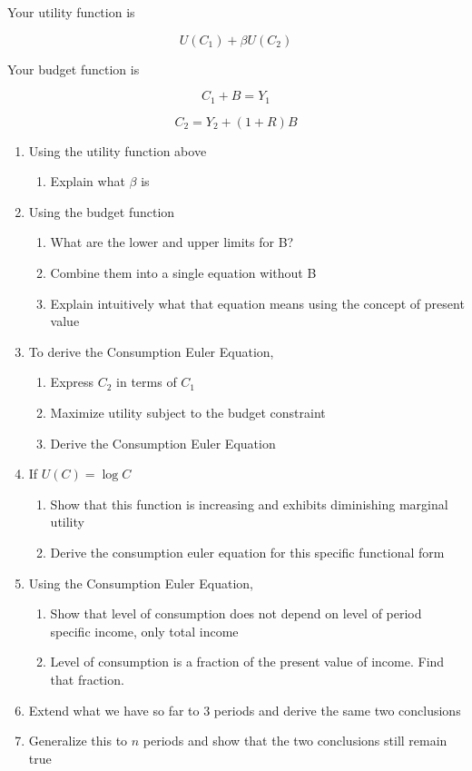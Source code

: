 \documentclass[11pt]{scrartcl}
\begin{document}
Your utility function is

\[U(C_1) + \beta U(C_2)\]

Your budget function is 

\[C_1 + B = Y_1\]

\[C_2 = Y_2 + (1+R)B\]

\begin{enumerate}
\item Using the utility function above
\begin{enumerate}
\item Explain what $\beta$ is
\end{enumerate}
\item Using the budget function
\begin{enumerate}
\item What are the lower and upper limits for B?
\item Combine them into a single equation without B
\item Explain intuitively what that equation means using the concept of present value
\end{enumerate}
\item To derive the Consumption Euler Equation,
\begin{enumerate}
\item Express $C_2$ in terms of $C_1$
\item Maximize utility subject to the budget constraint
\item Derive the Consumption Euler Equation
\end{enumerate}
\item If $U(C) = \log{C}$
\begin{enumerate}
\item Show that this function is increasing and exhibits diminishing marginal utility
\item Derive the consumption euler equation for this specific functional form
\end{enumerate}
\item Using the Consumption Euler Equation,
\begin{enumerate}
\item Show that level of consumption does not depend on level of period specific income, only total income
\item Level of consumption is a fraction of the present value of income. Find that fraction.
\end{enumerate}
\item Extend what we have so far to 3 periods and derive the same two conclusions
\item Generalize this to $n$ periods and show that the two conclusions still remain true


\end{enumerate}
\end{document}
